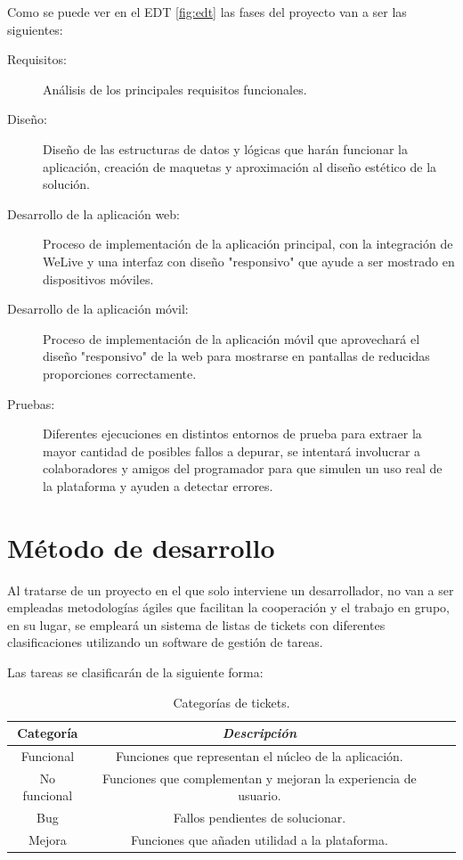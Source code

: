 \documentclass{DeustoFDP}
\begin{document}
Como se puede ver en el EDT \ref{fig:edt} las fases del proyecto van a ser las siguientes:
\begin{description}
    \item[Requisitos:] Análisis de los principales requisitos funcionales.
    \item[Diseño:] Diseño de las estructuras de datos y lógicas que harán funcionar la aplicación, creación de maquetas y aproximación al diseño estético de la solución.
    \item[Desarrollo de la aplicación web:] Proceso de implementación de la aplicación principal, con la integración de WeLive y una interfaz con diseño "responsivo" que ayude a ser mostrado en dispositivos móviles.
    \item[Desarrollo de la aplicación móvil:] Proceso de implementación de la aplicación móvil que aprovechará el diseño "responsivo" de la web para mostrarse en pantallas de reducidas proporciones correctamente.
    \item[Pruebas:] Diferentes ejecuciones en distintos entornos de prueba para extraer la mayor cantidad de posibles fallos a depurar, se intentará involucrar a colaboradores y amigos del programador para que simulen un uso real de la plataforma y ayuden a detectar errores.
\end{description}

\section{Método de desarrollo}
Al tratarse de un proyecto en el que solo interviene un desarrollador, no van a ser empleadas metodologías ágiles que facilitan la cooperación y el trabajo en grupo, en su lugar, se empleará un sistema de listas de tickets con diferentes clasificaciones utilizando un software de gestión de tareas.

Las tareas se clasificarán de la siguiente forma:
\begin{table}[H]
   	\centering
   	\caption{Categorías de tickets.}\label{tab:presupuestoperfiles}
   	\begin{tabular}{cccc}
   		\toprule
   		\textbf{Categoría} & \emph{Descripción}\\
   		\midrule
   		Funcional  & Funciones que representan el núcleo de la aplicación.\\
   		No funcional   & Funciones que complementan y mejoran la experiencia de usuario.\\
   		Bug & Fallos pendientes de solucionar.\\
   		Mejora & Funciones que añaden utilidad a la plataforma.\\
   		\bottomrule
   	\end{tabular}
\end{table}
\end{document}
